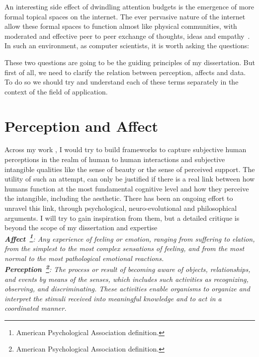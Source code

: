 An interesting side effect of dwindling attention budgets is the emergence of more formal topical spaces on the internet. The ever pervasive nature of the internet allow these formal spaces to function almost like physical communities, with moderated and effective peer to peer exchange of thoughts, ideas and empathy~\cite{kummervold2002social,squire2015should,hwang2010social}.
In such an environment, as computer scientists, it is worth asking the questions:

\noindent{}

\vspace{1cm}
These two questions are going to be the guiding principles of my dissertation. But first of all, we need to clarify the relation between perception, affects and data. To do so we should try and understand each of these terms separately in the context of the field of application.

\section{Perception and Affect}
Across my work , I would try to build frameworks to capture subjective human perceptions in the realm of human to human interactions and subjective intangible qualities like the sense of beauty or the sense of perceived support. The utility of such an attempt, can only be justified if there is a real link between how humans function at the most fundamental cognitive level and how they perceive the intangible, including the aesthetic. There has been an ongoing effort to unravel this link, through psychological, neuro-evolutional and philosophical arguments. I will try to gain inspiration from them, but a detailed critique is beyond the scope of my dissertation and expertise\\
\textsl{\textbf{Affect~\footnote{American Psychological Association definition.}}: Any experience of feeling or emotion, ranging from suffering to elation, from the simplest to the most complex sensations of feeling, and from the most normal to the most pathological emotional reactions.}\\
\textsl{\textbf{Perception~\footnote{American Psychological Association definition.}}: The process or result of becoming aware of objects, relationships, and events by means of the senses, which includes such activities as recognizing, observing, and discriminating. These activities enable organisms to organize and interpret the stimuli received into meaningful knowledge and to act in a coordinated manner.}\\

